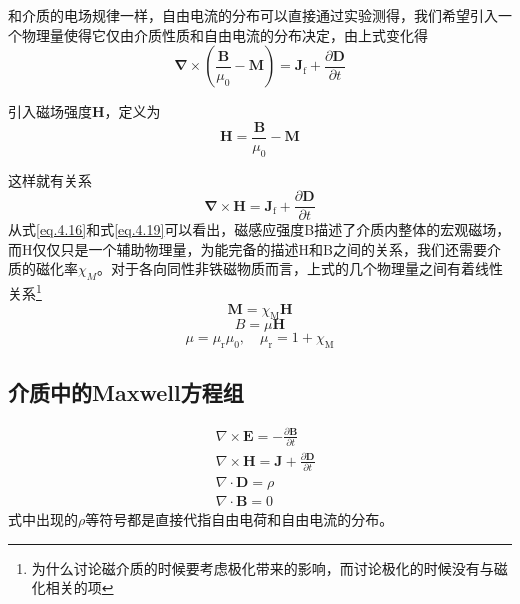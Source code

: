 		和介质的电场规律一样，自由电流的分布可以直接通过实验测得，我们希望引入一个物理量使得它仅由介质性质和自由电流的分布决定，由上式变化得
		\begin{equation}
			\boldsymbol{\nabla} \times\left(\frac{\boldsymbol{B}}{\mu_{0}}-\boldsymbol{M}\right)=\boldsymbol{J}_{\mathrm{f}}+\frac{\partial \boldsymbol{D}}{\partial t}
		\end{equation}

		引入磁场强度$\mathbf{H}$，定义为
		\begin{equation}
			\mathbf{H}=\frac{\boldsymbol{B}}{\mu_{0}}-\mathbf{M}
		\end{equation}

		这样就有关系
		\begin{equation}
		\label{eq.4.19}
			\boldsymbol{\nabla} \times \mathbf{H}=\boldsymbol{J}_{\mathrm{f}}+\frac{\partial \mathbf{D}}{\partial t}
		\end{equation}
		从式\ref{eq.4.16}和式\ref{eq.4.19}可以看出，磁感应强度B描述了介质内整体的宏观磁场，而H仅仅只是一个辅助物理量，为能完备的描述H和B之间的关系，我们还需要介质的磁化率$\chi_M$。对于各向同性非铁磁物质而言，上式的几个物理量之间有着线性关系\footnote{为什么讨论磁介质的时候要考虑极化带来的影响，而讨论极化的时候没有与磁化相关的项}
		\begin{equation}
			\mathbf{M}=\chi_{\mathrm{M}} \mathbf{H}
		\end{equation}
		\begin{equation}
			B=\mu \mathbf{H}
		\end{equation}
		\begin{equation}
			\mu=\mu_{\mathrm{r}} \mu_{0}, \quad \mu_{\mathrm{r}}=1+\chi_{\mathrm{M}}
		\end{equation}
	\subsection{介质中的Maxwell方程组}
		\begin{equation}
		\boxed{
			\begin{aligned}
			&\nabla \times \boldsymbol{E}=-\frac{\partial \boldsymbol{B}}{\partial t} \\
			&\nabla \times \boldsymbol{H}=\boldsymbol{J}+\frac{\partial \mathbf{D}}{\partial t} \\
			&\nabla \cdot \boldsymbol{D}=\rho \\
			&\nabla \cdot \boldsymbol{B}=0
			\end{aligned}}
		\end{equation}
		式中出现的$\rho$等符号都是直接代指自由电荷和自由电流的分布。

